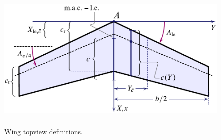 \begin{figure}[H]
\centering
\includegraphics[height=7cm]{Immagini/wing_topview_1_new}
\caption{Wing topview definitions.}
\label{wing}
\end{figure}


